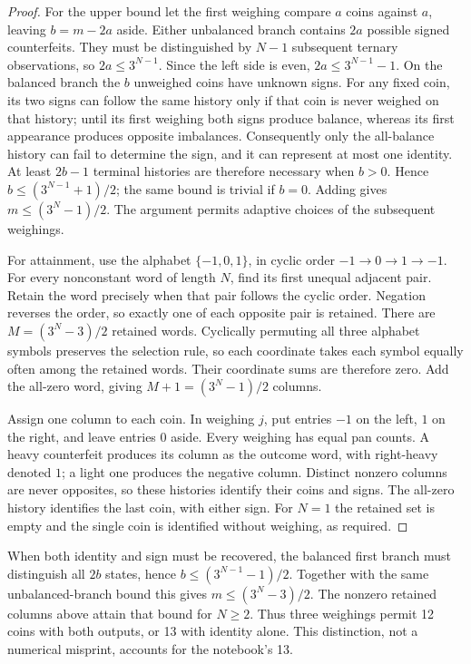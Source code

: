 \begin{proof}
For the upper bound let the first weighing compare \(a\) coins against
\(a\), leaving \(b=m-2a\) aside.  Either unbalanced branch contains
\(2a\) possible signed counterfeits.  They must be distinguished by
\(N-1\) subsequent ternary observations, so
\(2a\leq3^{N-1}\).  Since the left side is even,
\(2a\leq3^{N-1}-1\).  On the balanced branch the \(b\) unweighed coins
have unknown signs.  For any fixed coin, its two signs can follow the same
history only if that coin is never weighed on that history; until its first
weighing both signs produce balance, whereas its first appearance produces
opposite imbalances.  Consequently only the all-balance history can fail to
determine the sign, and it can represent at most one identity.  At least
\(2b-1\) terminal histories are therefore necessary when \(b>0\).
Hence \(b\leq(3^{N-1}+1)/2\); the same bound is trivial if \(b=0\).
Adding gives \(m\leq(3^N-1)/2\).  The argument permits adaptive choices
of the subsequent weighings.

For attainment, use the alphabet \(\{-1,0,1\}\), in cyclic order
\(-1\to0\to1\to-1\).  For every nonconstant word of length \(N\),
find its first unequal adjacent pair.  Retain the word precisely when that
pair follows the cyclic order.  Negation reverses the order, so exactly one
of each opposite pair is retained.  There are
\(M=(3^N-3)/2\) retained words.  Cyclically permuting all three alphabet
symbols preserves the selection rule, so each coordinate takes each symbol
equally often among the retained words.  Their coordinate sums are therefore
zero.  Add the all-zero word, giving \(M+1=(3^N-1)/2\) columns.

Assign one column to each coin.  In weighing \(j\), put entries \(-1\)
on the left, \(1\) on the right, and leave entries \(0\) aside.  Every
weighing has equal pan counts.  A heavy counterfeit produces its column as
the outcome word, with right-heavy denoted \(1\); a light one produces the
negative column.  Distinct nonzero columns are never opposites, so these
histories identify their coins and signs.  The all-zero history identifies
the last coin, with either sign.  For \(N=1\) the retained set is empty and
the single coin is identified without weighing, as required.
\end{proof}

\begin{remark}\ours{}
When both identity and sign must be recovered, the balanced first branch
must distinguish all \(2b\) states, hence
\(b\leq(3^{N-1}-1)/2\).  Together with the same unbalanced-branch bound
this gives \(m\leq(3^N-3)/2\).  The nonzero retained columns above attain
that bound for \(N\geq2\).  Thus three weighings permit 12 coins with
both outputs, or 13 with identity alone.  This distinction, not a numerical
misprint, accounts for the notebook's 13.
\end{remark}

